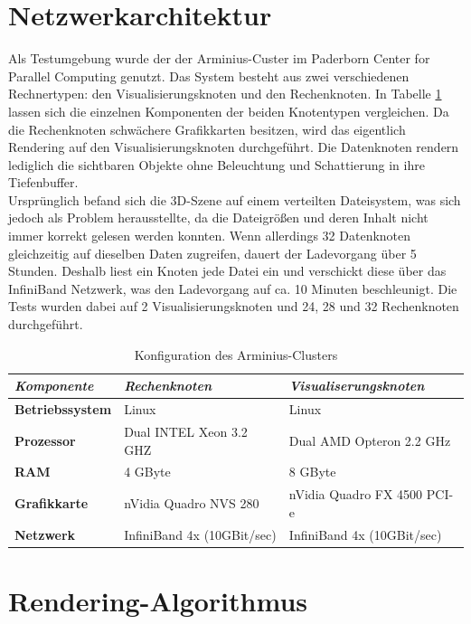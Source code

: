 \section{Netzwerkarchitektur}
\label{sec:impl:netzwerkarchitektur}
Als Testumgebung wurde der der Arminius-Custer im Paderborn Center for Parallel Computing \cite{pc2} genutzt. Das System besteht aus zwei verschiedenen Rechnertypen: den Visualisierungsknoten und den Rechenknoten. In Tabelle \ref{tab:impl:arminius} lassen sich die einzelnen Komponenten der beiden Knotentypen vergleichen. Da die Rechenknoten schwächere Grafikkarten besitzen, wird das eigentlich Rendering auf den Visualisierungsknoten durchgeführt. Die Datenknoten rendern lediglich die sichtbaren Objekte ohne Beleuchtung und Schattierung in ihre Tiefenbuffer.\\
Ursprünglich befand sich die 3D-Szene auf einem verteilten Dateisystem, was sich jedoch als Problem herausstellte, da die Dateigrößen und deren Inhalt nicht immer korrekt gelesen werden konnten. Wenn allerdings 32 Datenknoten gleichzeitig auf dieselben Daten zugreifen, dauert der Ladevorgang über 5 Stunden. Deshalb liest ein Knoten jede Datei ein und verschickt diese über das InfiniBand Netzwerk, was den Ladevorgang auf ca. 10 Minuten beschleunigt. Die Tests wurden dabei auf 2 Visualisierungsknoten und 24, 28 und 32 Rechenknoten durchgeführt.

\begin{table}
 \centering
 \begin{tabular}{lll} %
  \toprule %
  \textit{Komponente} & \textit{Rechenknoten} & \textit{Visualiserungsknoten} \\
  \midrule
  \textbf{Betriebssystem} & Linux & Linux \\
  \textbf{Prozessor} & Dual INTEL Xeon 3.2 GHZ & Dual AMD Opteron 2.2 GHz \\
  \textbf{RAM} & 4 GByte & 8 GByte \\
  \textbf{Grafikkarte} & nVidia Quadro NVS 280 & nVidia Quadro FX 4500 PCI-e \\
  \textbf{Netzwerk} & InfiniBand 4x (10GBit/sec) & InfiniBand 4x (10GBit/sec) \\
  \bottomrule
 \end{tabular} 
 \caption{Konfiguration des Arminius-Clusters}
 \label{tab:impl:arminius}
\end{table}

\section{Rendering-Algorithmus}
\label{sec:impl:renderalgo}

